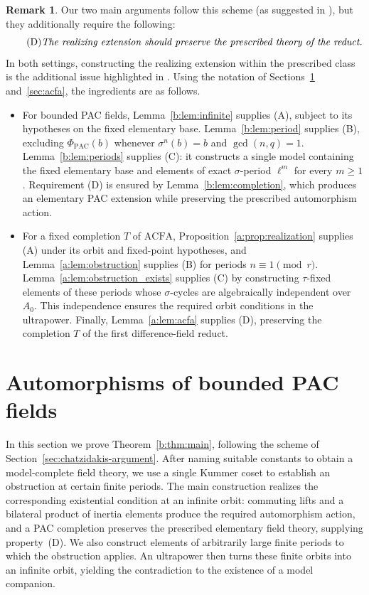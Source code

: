 \documentclass[10pt,a4paper]{amsart}
\renewcommand{\ge}{\geqslant}
\theoremstyle{definition}
\newtheorem{remark}[theorem]{Remark}
\newcommand{\ACFA}{\mathrm{ACFA}}
\begin{document}
\begin{remark}
Our two main arguments follow this scheme (as suggested in \cite[Remark~1.12]{Survey}), but they additionally require the following:
\begin{equation}
\tag{D}
\text{\emph{The realizing extension should preserve the prescribed theory of the reduct.}}
\end{equation}
In both settings, constructing the realizing extension within
the prescribed class is the additional issue highlighted in \cite[Remark~1.12]{Survey}. Using the notation of Sections~\ref{sec:bounded}
and~\ref{sec:acfa}, the ingredients are as follows.

\begin{itemize}
\item For bounded PAC fields, Lemma~\ref{b:lem:infinite}
supplies (A), subject to its hypotheses on the fixed elementary
base. Lemma~\ref{b:lem:period} supplies (B), excluding
$\Phi_{\mathrm{PAC}}(b)$ whenever $\sigma^n(b)=b$ and
$\gcd(n,q)=1$. Lemma~\ref{b:lem:periods} supplies (C):
it constructs a single model containing the fixed elementary
base and elements of exact $\sigma$-period $\ell^m$ for every
$m\ge1$.  Requirement (D) is ensured by Lemma~\ref{b:lem:completion},
which produces an elementary PAC extension while preserving
the prescribed automorphism action.

\item For a fixed completion $T$ of $\ACFA$,
Proposition~\ref{a:prop:realization} supplies (A) under its
orbit and fixed-point hypotheses, and
Lemma~\ref{a:lem:obstruction} supplies (B) for periods
$n\equiv1\pmod r$.
Lemma~\ref{a:lem:obstruction_exists} supplies (C) by constructing
$\tau$-fixed elements of these periods whose $\sigma$-cycles
are algebraically independent over $A_0$.
This independence ensures the required orbit conditions
in the ultrapower.
Finally, Lemma~\ref{a:lem:acfa} supplies (D), preserving
the completion $T$ of the first difference-field reduct.
\end{itemize}
\end{remark}




\section{Automorphisms of bounded PAC fields}\label{sec:bounded}

In this section we prove Theorem~\ref{b:thm:main}, following
the scheme of Section~\ref{sec:chatzidakis-argument}.
After naming suitable constants to obtain a model-complete
field theory, we use a single Kummer coset to establish an
obstruction at certain finite periods. The main construction
realizes the corresponding existential condition at an
infinite orbit: commuting lifts and a bilateral product of
inertia elements produce the required automorphism action,
and a PAC completion preserves the prescribed elementary
field theory, supplying property~(D).
We also construct elements of arbitrarily large finite
periods to which the obstruction applies.
An ultrapower then turns these finite orbits into an
infinite orbit, yielding the contradiction to the existence
of a model companion.
\end{document}
